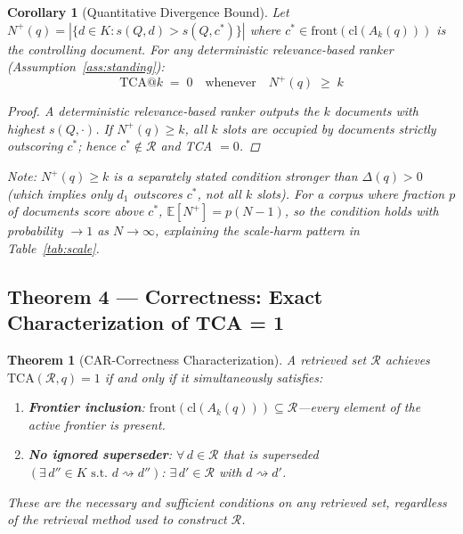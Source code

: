 \documentclass[11pt]{article}
\newtheorem{theorem}{Theorem}
\newtheorem{corollary}{Corollary}
\begin{document}
\begin{corollary}[Quantitative Divergence Bound]
\label{cor:bound}
Let $N^+(q) = |\{d \in K : s(Q,d) > s(Q,c^*)\}|$ where $c^* \in \mathrm{front}(\mathrm{cl}(A_k(q)))$ is the controlling document. For any \emph{deterministic} relevance-based ranker (Assumption~\ref{ass:standing}):
\[
  \mathrm{TCA@}k \;=\; 0 \quad \text{whenever}\quad N^+(q) \;\geq\; k
\]
\begin{proof}
A deterministic relevance-based ranker outputs the $k$ documents with highest $s(Q,\cdot)$. If $N^+(q) \geq k$, all $k$ slots are occupied by documents strictly outscoring $c^*$; hence $c^* \notin \mathcal{R}$ and TCA $= 0$.
\end{proof}
\noindent\emph{Note}: $N^+(q) \geq k$ is a separately stated condition stronger than $\Delta(q) > 0$ (which implies only $d_1$ outscores $c^*$, not all $k$ slots). For a corpus where fraction $p$ of documents score above $c^*$, $\mathbb{E}[N^+] = p(N{-}1)$, so the condition holds with probability $\to 1$ as $N \to \infty$, explaining the scale-harm pattern in Table~\ref{tab:scale}.
\end{corollary}

\subsection{Theorem 4 — Correctness: Exact Characterization of TCA = 1}

\setcounter{theorem}{3}
\begin{theorem}[CAR-Correctness Characterization]
\label{thm:characterization}
A retrieved set $\mathcal{R}$ achieves $\mathrm{TCA}(\mathcal{R},q) = 1$ if and only if it simultaneously satisfies:
\begin{enumerate}[noitemsep,label=(\roman*)]
  \item \textbf{Frontier inclusion}: $\mathrm{front}(\mathrm{cl}(A_k(q))) \subseteq \mathcal{R}$---every element of the active frontier is present.
  \item \textbf{No ignored superseder}: $\forall\, d \in \mathcal{R}$ that is superseded $(\exists\, d'' \in K\text{ s.t.\ }d \rightsquigarrow d'')$: $\exists\, d' \in \mathcal{R}$ with $d \rightsquigarrow d'$.
\end{enumerate}
These are the \emph{necessary and sufficient} conditions on any retrieved set, regardless of the retrieval method used to construct $\mathcal{R}$.
\end{theorem}
\end{document}
